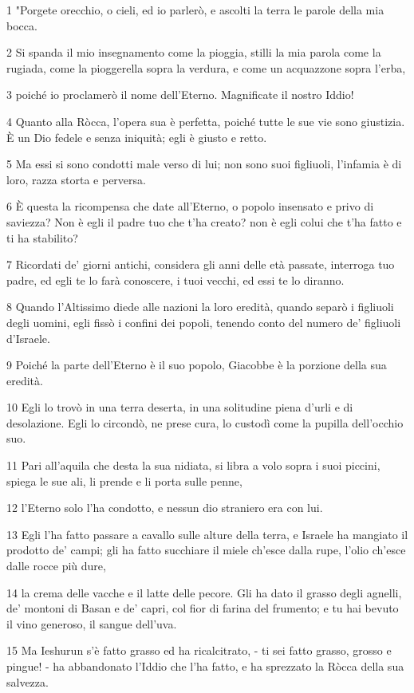 \par 1 "Porgete orecchio, o cieli, ed io parlerò, e ascolti la terra le parole della mia bocca.
\par 2 Si spanda il mio insegnamento come la pioggia, stilli la mia parola come la rugiada, come la pioggerella sopra la verdura, e come un acquazzone sopra l'erba,
\par 3 poiché io proclamerò il nome dell'Eterno. Magnificate il nostro Iddio!
\par 4 Quanto alla Ròcca, l'opera sua è perfetta, poiché tutte le sue vie sono giustizia. È un Dio fedele e senza iniquità; egli è giusto e retto.
\par 5 Ma essi si sono condotti male verso di lui; non sono suoi figliuoli, l'infamia è di loro, razza storta e perversa.
\par 6 È questa la ricompensa che date all'Eterno, o popolo insensato e privo di saviezza? Non è egli il padre tuo che t'ha creato? non è egli colui che t'ha fatto e ti ha stabilito?
\par 7 Ricordati de' giorni antichi, considera gli anni delle età passate, interroga tuo padre, ed egli te lo farà conoscere, i tuoi vecchi, ed essi te lo diranno.
\par 8 Quando l'Altissimo diede alle nazioni la loro eredità, quando separò i figliuoli degli uomini, egli fissò i confini dei popoli, tenendo conto del numero de' figliuoli d'Israele.
\par 9 Poiché la parte dell'Eterno è il suo popolo, Giacobbe è la porzione della sua eredità.
\par 10 Egli lo trovò in una terra deserta, in una solitudine piena d'urli e di desolazione. Egli lo circondò, ne prese cura, lo custodì come la pupilla dell'occhio suo.
\par 11 Pari all'aquila che desta la sua nidiata, si libra a volo sopra i suoi piccini, spiega le sue ali, li prende e li porta sulle penne,
\par 12 l'Eterno solo l'ha condotto, e nessun dio straniero era con lui.
\par 13 Egli l'ha fatto passare a cavallo sulle alture della terra, e Israele ha mangiato il prodotto de' campi; gli ha fatto succhiare il miele ch'esce dalla rupe, l'olio ch'esce dalle rocce più dure,
\par 14 la crema delle vacche e il latte delle pecore. Gli ha dato il grasso degli agnelli, de' montoni di Basan e de' capri, col fior di farina del frumento; e tu hai bevuto il vino generoso, il sangue dell'uva.
\par 15 Ma Ieshurun s'è fatto grasso ed ha ricalcitrato, - ti sei fatto grasso, grosso e pingue! - ha abbandonato l'Iddio che l'ha fatto, e ha sprezzato la Ròcca della sua salvezza.
